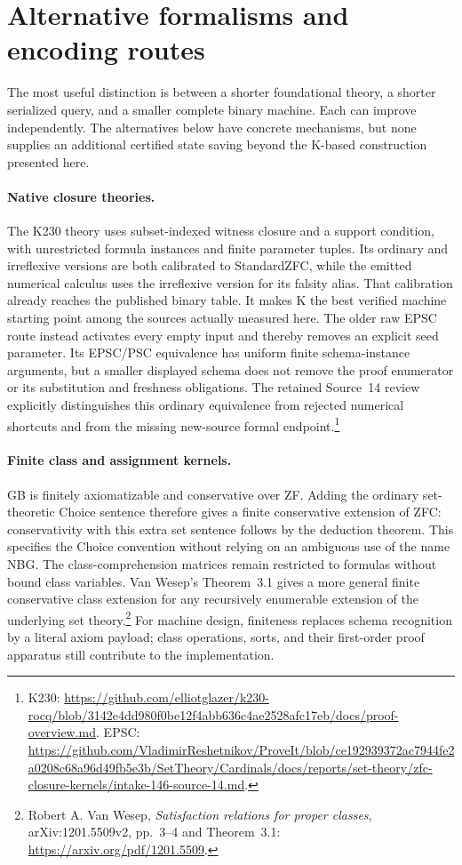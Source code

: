 \section{Alternative formalisms and encoding routes}
\label{sec:alternatives}

The most useful distinction is between a shorter foundational theory,
a shorter serialized query, and a smaller complete binary machine.
Each can improve independently.  The alternatives below have concrete
mechanisms, but none supplies an additional certified state saving
beyond the K-based construction presented here.

\paragraph{Native closure theories.}
The K230 theory uses subset-indexed witness closure and a support
condition, with unrestricted formula instances and finite parameter
tuples.  Its ordinary and irreflexive versions are both calibrated
to StandardZFC, while the emitted numerical calculus uses the
irreflexive version for its falsity alias.  That calibration already
reaches the published binary table.  It makes K the best verified
machine starting point among the sources actually measured here.
The older raw EPSC route instead activates every empty input and
thereby removes an explicit seed parameter.  Its EPSC/PSC equivalence
has uniform finite schema-instance arguments, but a smaller displayed
schema does not remove the proof enumerator or its substitution and
freshness obligations.  The retained Source~14 review explicitly
distinguishes this ordinary equivalence from rejected numerical
shortcuts and from the missing new-source formal endpoint.\footnote{
K230: \url{https://github.com/elliotglazer/k230-rocq/blob/3142e4dd980f0be12f4abb636c4ae2528afc17eb/docs/proof-overview.md}.
EPSC: \url{https://github.com/VladimirReshetnikov/ProveIt/blob/ce192939372ac7944fe2a0208c68a96d49fb5e3b/SetTheory/Cardinals/docs/reports/set-theory/zfc-closure-kernels/intake-146-source-14.md}.}

\paragraph{Finite class and assignment kernels.}
GB is finitely axiomatizable and conservative over ZF.  Adding the
ordinary set-theoretic Choice sentence therefore gives a finite
conservative extension of ZFC: conservativity with this extra set
sentence follows by the deduction theorem.  This specifies the
Choice convention without relying on an ambiguous use of the name
NBG.  The class-comprehension matrices remain restricted to formulas
without bound class variables.  Van Wesep's Theorem~3.1 gives a more
general finite conservative class extension for any recursively
enumerable extension of the underlying set theory.\footnote{
Robert A. Van Wesep, \emph{Satisfaction relations for proper classes},
arXiv:1201.5509v2, pp.~3--4 and Theorem~3.1:
\url{https://arxiv.org/pdf/1201.5509}.}
For machine design, finiteness replaces schema recognition by a
literal axiom payload; class operations, sorts, and their first-order
proof apparatus still contribute to the implementation.

